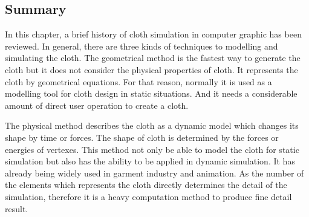 \subsection{Summary}

In this chapter, a brief history of cloth simulation in computer graphic has been reviewed.  
In general, there are three kinds of techniques to modelling and simulating the cloth. 
The geometrical method is the fastest way to generate the cloth but it does not consider the physical properties of cloth. It represents the cloth by geometrical equations. For that reason, normally it is used as a modelling tool for cloth design in static situations. And it needs a considerable amount of direct user operation to create a cloth. 

The physical method describes the cloth as a dynamic model which changes its shape by time or forces. The shape of cloth is determined by the forces or energies of vertexes. This method not only be able to model the cloth for static simulation but also has the ability to be applied in dynamic simulation. It has already being widely used in garment industry and animation. As the number of the elements which represents the cloth directly determines the detail of the simulation, therefore it is a heavy computation method to produce fine detail result.   

